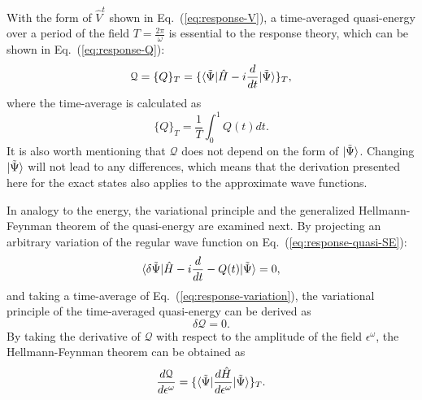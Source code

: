 With the form of $\hat{V}^{t}$ shown in Eq.~(\ref{eq:response-V}), a time-averaged quasi-energy\cite{Christiansen1998} over a period of the field $T=\frac{2\pi}{\omega}$ is essential to the response theory, which can be shown in Eq.~(\ref{eq:response-Q}):
\begin{equation}
\mathcal{Q} = \{Q\}_{T} = \{\langle\tilde{\Psi} |\hat{H}-i\frac{d}{dt}| \tilde{\Psi} \rangle\}_{T},
\label{eq:response-Q}
\end{equation}
where the time-average is calculated as
\begin{equation}
\{Q\}_{T} = \frac{1}{T}\int_{0}^{1}Q(t)dt.
\end{equation}
It is also worth mentioning that $\mathcal{Q}$ does not depend on the form of $| \tilde{\Psi} \rangle$. Changing $| \tilde{\Psi} \rangle$ will not lead to any differences, which means that the derivation presented here for the exact states also applies to the approximate wave functions.

In analogy to the energy, the variational principle\cite{Ekeland1974} and the generalized Hellmann-Feynman theorem\cite{Hayes1965} of the quasi-energy are examined next. By projecting an arbitrary variation of the regular wave function on Eq.~(\ref{eq:response-quasi-SE}): 
\begin{equation}
\langle\delta\tilde{\Psi} | \hat{H} - i\frac{d}{dt} - Q(t) | \tilde{\Psi} \rangle = 0, 
\label{eq:response-variation}
\end{equation}
and taking a time-average of Eq.~(\ref{eq:response-variation}), the variational principle of the time-averaged quasi-energy can be derived as 
\begin{equation}
\delta\mathcal{Q} = 0.
\end{equation}
By taking the derivative of $\mathcal{Q}$ with respect to the amplitude of the field $\epsilon^{\omega}$, the Hellmann-Feynman theorem can be obtained as
\begin{equation}
\frac{d\mathcal{	Q}}{d\epsilon^{\omega}}=\{\langle\tilde{\Psi} |\frac{d\hat{H}}{d\epsilon^{\omega}}| \tilde{\Psi} \rangle\}_{T}.
\end{equation}

